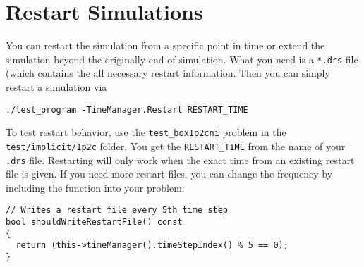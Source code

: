 \section{Restart \Dumux Simulations}
\label{sc_restartsimulations}

You can restart the simulation
from a specific point in time or extend the simulation beyond the originally
end of simulation. What you need is a \texttt{*.drs} file (which contains the
all necessary restart information.
Then you can simply restart a simulation via
\begin{lstlisting}[style=Bash]
./test_program -TimeManager.Restart RESTART_TIME
\end{lstlisting}
To test restart behavior, use the \texttt{test\_box1p2cni} problem
in the \texttt{test/implicit/1p2c} folder.
You get the \texttt{RESTART\_TIME} from the name of your \texttt{.drs} file.
Restarting will only work when the exact time from an existing restart file is given.
If you need more restart files, you can change the frequency
by including the function into your problem:
\begin{lstlisting}[style=DumuxCode]
// Writes a restart file every 5th time step
bool shouldWriteRestartFile() const
{
  return (this->timeManager().timeStepIndex() % 5 == 0);
}
\end{lstlisting}

